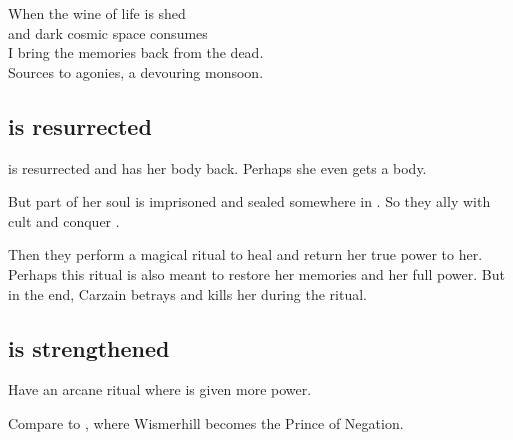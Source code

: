 \begin{garbage}
{  When the wine of life is shed\\
  and dark cosmic space consumes\\
  I bring the memories back from the dead.\\
  Sources to agonies, a devouring monsoon.
}









\subsection{\Belzir{} is resurrected}
\Belzir{} is resurrected and has her body back. 
Perhaps she even gets a \resvil{} body. 

But part of her soul is imprisoned and sealed somewhere in \Redce. So they ally with  cult and conquer \Redce. 

Then they perform a magical ritual to heal \Belzir{} and return her true power to her.
Perhaps this ritual is also meant to restore her memories and her full \Malach{} power. 
But in the end, Carzain betrays \Belzir{} and kills her during the ritual. 








\subsection{\Vizsherioch{} is strengthened}
Have an arcane ritual where \Vizsherioch{} is given more power. 

Compare to , where Wismerhill becomes the Prince of Negation. 









\end{garbage}
